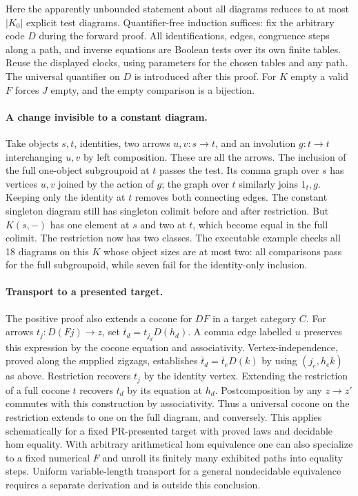 Here the apparently unbounded statement about all diagrams reduces to at most $|K_0|$ explicit test diagrams. Quantifier-free induction suffices: fix the arbitrary code $D$ during the forward proof. All identifications, edges, congruence steps along a path, and inverse equations are Boolean tests over its own finite tables. Reuse the displayed clocks, using parameters for the chosen tables and any path. The universal quantifier on $D$ is introduced after this proof. For $K$ empty a valid $F$ forces $J$ empty, and the empty comparison is a bijection.

\paragraph{A change invisible to a constant diagram.}
Take objects $s,t$, identities, two arrows $u,v:s\to t$, and an involution $g:t\to t$ interchanging $u,v$ by left composition. These are all the arrows. The inclusion of the full one-object subgroupoid at $t$ passes the test. Its comma graph over $s$ has vertices $u,v$ joined by the action of $g$; the graph over $t$ similarly joins $1_t,g$. Keeping only the identity at $t$ removes both connecting edges. The constant singleton diagram still has singleton colimit before and after restriction. But $K(s,-)$ has one element at $s$ and two at $t$, which become equal in the full colimit. The restriction now has two classes. The executable example checks all 18 diagrams on this $K$ whose object sizes are at most two: all comparisons pass for the full subgroupoid, while seven fail for the identity-only inclusion.

\paragraph{Transport to a presented target.}
The positive proof also extends a cocone for $DF$ in a target category $C$. For arrows $t_j:D(Fj)\to z$, set $\bar t_d=t_{j_d}D(h_d)$. A comma edge labelled $u$ preserves this expression by the cocone equation and associativity. Vertex-independence, proved along the supplied zigzags, establishes
$\bar t_d=\bar t_eD(k)$ by using $(j_e,h_e k)$ as above. Restriction recovers $t_j$ by the identity vertex. Extending the restriction of a full cocone $t$ recovers $t_d$ by its equation at $h_d$. Postcomposition by any $z\to z'$ commutes with this construction by associativity. Thus a universal cocone on the restriction extends to one on the full diagram, and conversely. This applies schematically for a fixed PR-presented target with proved laws and decidable hom equality. With arbitrary arithmetical hom equivalence one can also specialize to a fixed numerical $F$ and unroll its finitely many exhibited paths into equality steps. Uniform variable-length transport for a general nondecidable equivalence requires a separate derivation and is outside this conclusion.

